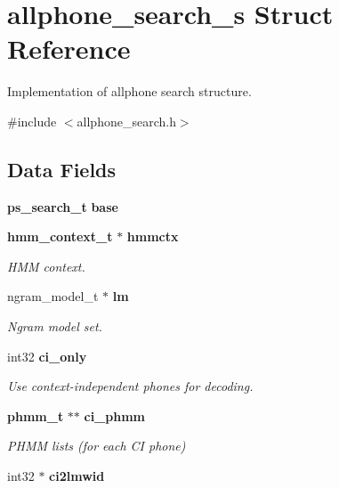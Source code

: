 \section{allphone\-\_\-search\-\_\-s Struct Reference}
\label{structallphone__search__s}


Implementation of allphone search structure.  




{\ttfamily \#include $<$allphone\-\_\-search.\-h$>$}

\subsection*{Data Fields}
\begin{DoxyCompactItemize}
\item 
{\bf ps\-\_\-search\-\_\-t} {\bfseries base}\label{structallphone__search__s_aed4067ba47369dcbb84633cb436c209a}

\item 
{\bf hmm\-\_\-context\-\_\-t} $\ast$ {\bf hmmctx}
\begin{DoxyCompactList}\small\item\em H\-M\-M context. \end{DoxyCompactList}\item 
ngram\-\_\-model\-\_\-t $\ast$ {\bf lm}\label{structallphone__search__s_ac1220a564a57a418312800df44bd95ca}

\begin{DoxyCompactList}\small\item\em Ngram model set. \end{DoxyCompactList}\item 
int32 {\bf ci\-\_\-only}\label{structallphone__search__s_ab4d9470249d15abca8e9fd01f1d437a7}

\begin{DoxyCompactList}\small\item\em Use context-\/independent phones for decoding. \end{DoxyCompactList}\item 
{\bf phmm\-\_\-t} $\ast$$\ast$ {\bf ci\-\_\-phmm}\label{structallphone__search__s_a2646c8ad402da8a644ecebd28386de0d}

\begin{DoxyCompactList}\small\item\em P\-H\-M\-M lists (for each C\-I phone) \end{DoxyCompactList}\item 
int32 $\ast$ {\bf ci2lmwid}\label{structallphone__search__s_a9021eb4d9645cc3138535dfad8272601}


\end{DoxyCompactItemize}
